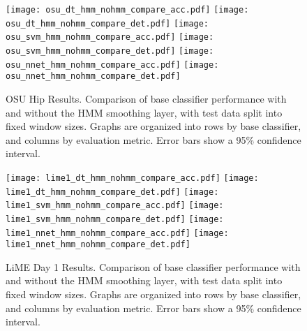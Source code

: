 \begin{figure}[H]
 \centering
 \texttt{[image: osu\_dt\_hmm\_nohmm\_compare\_acc.pdf]} \hspace{1em}\vspace{1em}
 \texttt{[image: osu\_dt\_hmm\_nohmm\_compare\_det.pdf]} 
 \texttt{[image: osu\_svm\_hmm\_nohmm\_compare\_acc.pdf]} \hspace{1em}\vspace{1em}
 \texttt{[image: osu\_svm\_hmm\_nohmm\_compare\_det.pdf]}
 \texttt{[image: osu\_nnet\_hmm\_nohmm\_compare\_acc.pdf]} \hspace{1em}
 \texttt{[image: osu\_nnet\_hmm\_nohmm\_compare\_det.pdf]}
 \caption{OSU Hip Results. Comparison of base classifier performance with and without the HMM
  smoothing layer, with test data split into fixed window sizes. Graphs are organized into rows by base
  classifier, and columns by evaluation metric. Error bars show a 95\% confidence interval.}
 \label{fig:osu_hmm}
\end{figure}

\begin{figure}[H]
 \centering
 \texttt{[image: lime1\_dt\_hmm\_nohmm\_compare\_acc.pdf]} \hspace{1em}\vspace{1em}
 \texttt{[image: lime1\_dt\_hmm\_nohmm\_compare\_det.pdf]} 
 \texttt{[image: lime1\_svm\_hmm\_nohmm\_compare\_acc.pdf]} \hspace{1em}\vspace{1em}
 \texttt{[image: lime1\_svm\_hmm\_nohmm\_compare\_det.pdf]}
 \texttt{[image: lime1\_nnet\_hmm\_nohmm\_compare\_acc.pdf]} \hspace{1em}
 \texttt{[image: lime1\_nnet\_hmm\_nohmm\_compare\_det.pdf]}
 \caption{LiME Day 1 Results. Comparison of base classifier performance with and without the HMM
  smoothing layer, with test data split into fixed window sizes. Graphs are organized into rows by base
  classifier, and columns by evaluation metric. Error bars show a 95\% confidence interval.}
 \label{fig:lime1_hmm}
\end{figure}

